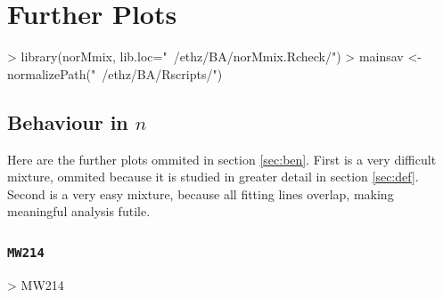 \chapter{Further Plots}


\begin{Schunk}
\begin{Sinput}
>     library(norMmix, lib.loc="~/ethz/BA/norMmix.Rcheck/")
>     mainsav <- normalizePath("~/ethz/BA/Rscripts/")
\end{Sinput}
\end{Schunk}

\section{Behaviour in $n$}
\label{app:ben}

Here are the further plots ommited in section \ref{sec:ben}.
First is a very difficult mixture, ommited because it is studied in greater 
detail in section \ref{sec:def}. Second is a very easy mixture, because all
fitting lines overlap, making meaningful analysis futile.

\subsection{{\tt MW214}}

\begin{Schunk}
\begin{Sinput}
>     MW214
\end{Sinput}
\end{Schunk}


